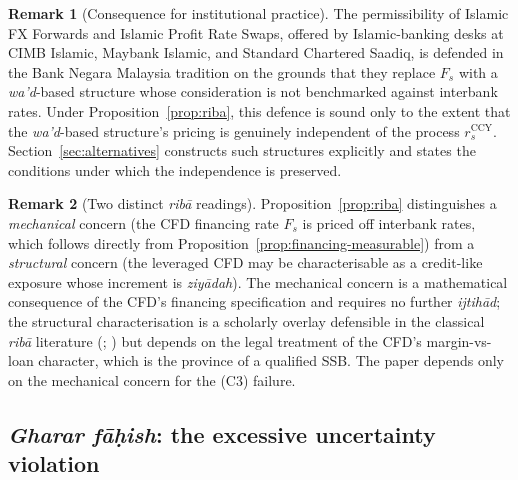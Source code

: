 \documentclass[preprint,12pt,authoryear]{elsarticle}
\theoremstyle{definition}
\newtheorem{remark}{Remark}[section]
\begin{document}
\begin{remark}[Consequence for institutional practice]
\label{rem:institutional-consequence}
The permissibility of Islamic FX Forwards and Islamic Profit Rate
Swaps, offered by Islamic-banking desks at CIMB Islamic, Maybank
Islamic, and Standard Chartered Saadiq, is defended in the Bank
Negara Malaysia tradition on the grounds that they replace $F_s$
with a \emph{wa'd}-based structure whose consideration is not
benchmarked against interbank rates. Under
Proposition~\ref{prop:riba}, this defence is sound only to the
extent that the \emph{wa'd}-based structure's pricing is genuinely
independent of the process $r^{\text{CCY}}_s$.
Section~\ref{sec:alternatives} constructs such structures explicitly
and states the conditions under which the independence is preserved.
\end{remark}

\begin{remark}[Two distinct \emph{rib\={a}} readings]
\label{rem:riba-two-concerns}
Proposition~\ref{prop:riba} distinguishes a \emph{mechanical}
concern (the CFD financing rate $F_s$ is priced off interbank
rates, which follows directly from
Proposition~\ref{prop:financing-measurable}) from a
\emph{structural} concern (the leveraged CFD may be
characterisable as a credit-like exposure whose increment is
\emph{ziy\={a}dah}). The mechanical concern is a mathematical
consequence of the CFD's financing specification and requires no
further \emph{ijtih\={a}d}; the structural characterisation is a
scholarly overlay defensible in the classical \emph{rib\={a}}
literature (\citealp{Usmani2002}; \citealp{Kamali2000}) but
depends on the legal treatment of the CFD's margin-vs-loan
character, which is the province of a qualified SSB. The paper
depends only on the mechanical concern for the (C3) failure.
\end{remark}

\subsection{\emph{Gharar f\={a}\d{h}ish}: the excessive uncertainty
    violation}
\label{sec:gharar-analysis}
\end{document}
